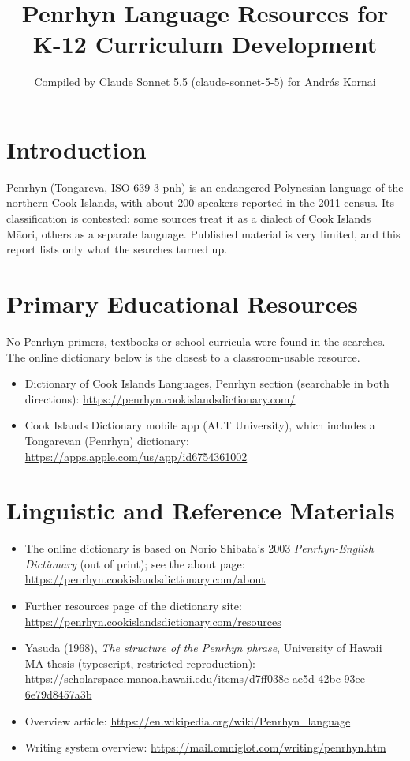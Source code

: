 \documentclass[12pt]{article}
\title{Penrhyn Language Resources for K-12 Curriculum Development}
\author{Compiled by Claude Sonnet 5.5 (claude-sonnet-5-5) for Andr\'as Kornai}
\date{}
\begin{document}
\maketitle

\section{Introduction}
Penrhyn (Tongareva, ISO 639-3 pnh) is an endangered Polynesian language of the northern Cook Islands, with about 200 speakers reported in the 2011 census. Its classification is contested: some sources treat it as a dialect of Cook Islands M\=aori, others as a separate language. Published material is very limited, and this report lists only what the searches turned up.

\section{Primary Educational Resources}
No Penrhyn primers, textbooks or school curricula were found in the searches. The online dictionary below is the closest to a classroom-usable resource.
\begin{itemize}
\item Dictionary of Cook Islands Languages, Penrhyn section (searchable in both directions): \url{https://penrhyn.cookislandsdictionary.com/}
\item Cook Islands Dictionary mobile app (AUT University), which includes a Tongarevan (Penrhyn) dictionary: \url{https://apps.apple.com/us/app/id6754361002}
\end{itemize}

\section{Linguistic and Reference Materials}
\begin{itemize}
\item The online dictionary is based on Norio Shibata's 2003 \emph{Penrhyn-English Dictionary} (out of print); see the about page: \url{https://penrhyn.cookislandsdictionary.com/about}
\item Further resources page of the dictionary site: \url{https://penrhyn.cookislandsdictionary.com/resources}
\item Yasuda (1968), \emph{The structure of the Penrhyn phrase}, University of Hawaii MA thesis (typescript, restricted reproduction): \url{https://scholarspace.manoa.hawaii.edu/items/d7ff038e-ae5d-42bc-93ee-6e79d8457a3b}
\item Overview article: \url{https://en.wikipedia.org/wiki/Penrhyn_language}
\item Writing system overview: \url{https://mail.omniglot.com/writing/penrhyn.htm}
\end{itemize}
\end{document}
